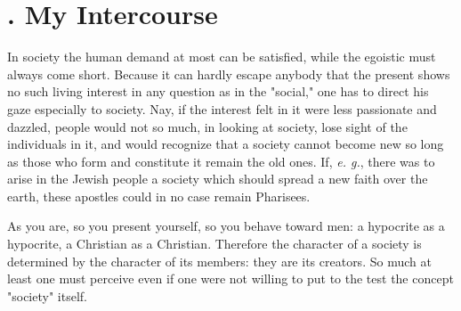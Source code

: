 \section[2. My Intercourse]{. My Intercourse}

In society the human demand at most can be satisfied, while the egoistic must 
always come short. Because it can hardly escape anybody that the present shows 
no such living interest in any question as in the "{}social,"{} one has to 
direct his gaze especially to society. Nay, if the interest felt in it were 
less passionate and dazzled, people would not so much, in looking at society, 
lose sight of the individuals in it, and would recognize that a society cannot 
become new so long as those who form and constitute it remain the old ones. 
If, \textit{e. g.}, there was to arise in the Jewish people a society which 
should spread a new faith over the earth, these apostles could in no case 
remain Pharisees.

As you are, so you present yourself, so you behave toward men: a hypocrite as 
a hypocrite, a Christian as a Christian. Therefore the character of a society 
is determined by the character of its members: they are its creators. So much 
at least one must perceive even if one were not willing to put to the test the 
concept "{}society"{} itself.

